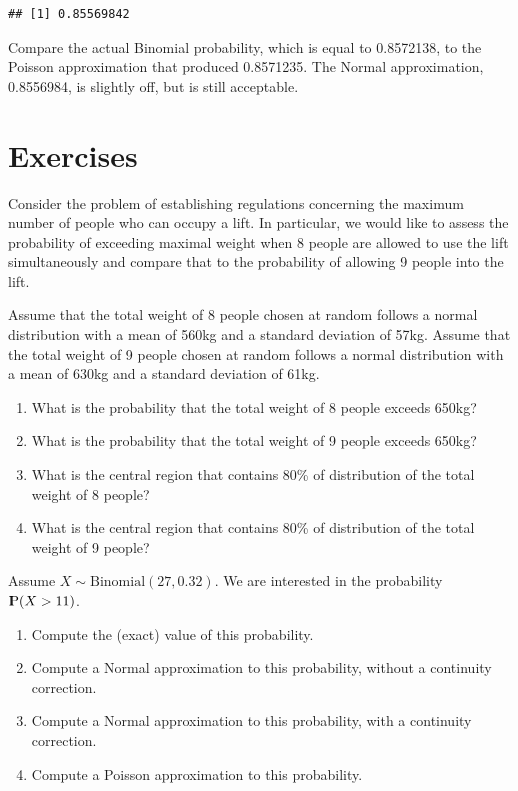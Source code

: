 \documentclass[]{krantz}
\newcommand{\Prob}{{\rm I\kern-.3em P}}
\theoremstyle{definition}
\theoremstyle{definition}
\theoremstyle{definition}
\theoremstyle{remark}
\let\BeginKnitrBlock\begin \let\EndKnitrBlock\end
\begin{document}
\begin{verbatim}
## [1] 0.85569842
\end{verbatim}

Compare the actual Binomial probability, which is equal to 0.8572138, to
the Poisson approximation that produced 0.8571235. The Normal
approximation, 0.8556984, is slightly off, but is still acceptable.

\hypertarget{Normal4}{%
\section{Exercises}\label{Normal4}}

\BeginKnitrBlock{exercise}
\protect\hypertarget{exr:unnamed-chunk-89}{}{\label{exr:unnamed-chunk-89} }Consider the problem of establishing regulations
concerning the maximum number of people who can occupy a lift. In
particular, we would like to assess the probability of exceeding maximal
weight when 8 people are allowed to use the lift simultaneously and
compare that to the probability of allowing 9 people into the lift.

Assume that the total weight of 8 people chosen at random follows a
normal distribution with a mean of 560kg and a standard deviation of
57kg. Assume that the total weight of 9 people chosen at random follows
a normal distribution with a mean of 630kg and a standard deviation of
61kg.

\begin{enumerate}
\def\labelenumi{\arabic{enumi}.}
\item
  What is the probability that the total weight of 8 people exceeds
  650kg?
\item
  What is the probability that the total weight of 9 people exceeds
  650kg?
\item
  What is the central region that contains 80\% of distribution of the
  total weight of 8 people?
\item
  What is the central region that contains 80\% of distribution of the
  total weight of 9 people?
\end{enumerate}
\EndKnitrBlock{exercise}

\BeginKnitrBlock{exercise}
\protect\hypertarget{exr:unnamed-chunk-90}{}{\label{exr:unnamed-chunk-90} }Assume \(X \sim \mbox{Binomial}(27,0.32)\). We are
interested in the probability \(\Prob(X > 11)\).

\begin{enumerate}
\def\labelenumi{\arabic{enumi}.}
\item
  Compute the (exact) value of this probability.
\item
  Compute a Normal approximation to this probability, without a
  continuity correction.
\item
  Compute a Normal approximation to this probability, with a
  continuity correction.
\item
  Compute a Poisson approximation to this probability.
\end{enumerate}
\EndKnitrBlock{exercise}
\end{document}
